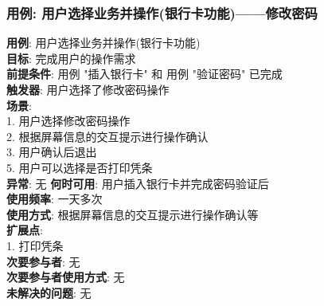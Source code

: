 \documentclass[UTF8]{article}
\begin{document}
\subsubsection{用例: 用户选择业务并操作(银行卡功能)——修改密码}
\noindent
\textbf{用例}: 用户选择业务并操作(银行卡功能)
\\
\textbf{目标}: 完成用户的操作需求
\\
\textbf{前提条件}: 用例 "插入银行卡" 和 用例 "验证密码" 已完成
\\
\textbf{触发器}: 用户选择了修改密码操作
\\
\textbf{场景}: \\
	\hspace*{2em}1. 用户选择修改密码操作 \\
	\hspace*{2em}2. 根据屏幕信息的交互提示进行操作确认 \\
	\hspace*{2em}3. 用户确认后退出 \\
	\hspace*{2em}5. 用户可以选择是否打印凭条 \\
\textbf{异常}: 无
\textbf{何时可用}: 用户插入银行卡并完成密码验证后
\\
\textbf{使用频率}: 一天多次
\\
\textbf{使用方式}: 根据屏幕信息的交互提示进行操作确认等
\\
\textbf{扩展点}: \\
	\hspace*{2em}1. 打印凭条 \\
\textbf{次要参与者}: 无
\\
\textbf{次要参与者使用方式}: 无
\\
\textbf{未解决的问题}: 无
	
	
\end{document}
